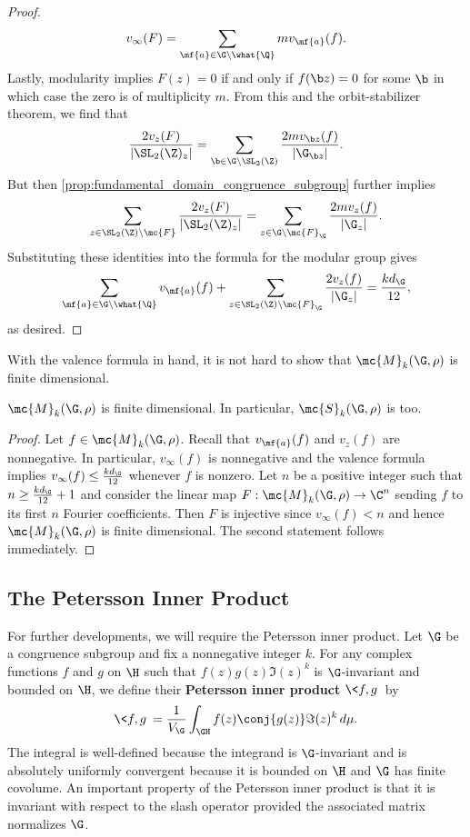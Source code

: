 \documentclass[12pt]{article}
\begin{document}
\begin{proof}
        \[
          v_{\infty}(F) = \sum_{\mf{a} \in \G\backslash\what{\Q}}mv_{\mf{a}}(f).
        \]
        Lastly, modularity implies \(F(z) = 0\) if and only if \(f(\b z) = 0\) for some \(\b\) in which case the zero is of multiplicity \(m\). From this and the orbit-stabilizer theorem, we find that
        \[
          \frac{2v_{z}(F)}{|\SL_{2}(\Z)_{z}|} = \sum_{\b \in \G\backslash\SL_{2}(\Z)}\frac{2mv_{\b z}(f)}{|\G_{\b z}|}.
        \]
        But then \cref{prop:fundamental_domain_congruence_subgroup} further implies
        \[
          \sum_{z \in \SL_{2}(\Z)\backslash\mc{F}}\frac{2v_{z}(F)}{|\SL_{2}(\Z)_{z}|} = \sum_{z \in \G\backslash\mc{F}_{\G}}\frac{2mv_{z}(f)}{|\G_{z}|}.
        \]
        Substituting these identities into the formula for the modular group gives
        \[
          \sum_{\mf{a} \in \G\backslash\what{\Q}}v_{\mf{a}}(f)+\sum_{z \in \SL_{2}(\Z)\backslash\mc{F}_{\G}}\frac{2v_{z}(f)}{|\G_{z}|} = \frac{kd_{\G}}{12},
        \]
        as desired.
      \end{proof}
      
      With the valence formula in hand, it is not hard to show that \(\mc{M}_{k}(\G,\rho)\) is finite dimensional.

      \begin{theorem}\label{thm:modular_forms_finite_dimensional}
        \(\mc{M}_{k}(\G,\rho)\) is finite dimensional. In particular, \(\mc{S}_{k}(\G,\rho)\) is too.
      \end{theorem}
      \begin{proof}
        Let \(f \in \mc{M}_{k}(\G,\rho)\). Recall that \(v_{\mf{a}}(f)\) and \(v_{z}(f)\) are nonnegative. In particular, \(v_{\infty}(f)\) is nonnegative and the valence formula implies \(v_{\infty}(f) \le \frac{kd_{\G}}{12}\) whenever \(f\) is nonzero. Let \(n\) be a positive integer such that \(n \ge \frac{kd_{\G}}{12}+1\) and consider the linear map \(F:\mc{M}_{k}(\G,\rho) \to \C^{n}\) sending \(f\) to its first \(n\) Fourier coefficients. Then \(F\) is injective since \(v_{\infty}(f) < n\) and hence \(\mc{M}_{k}(\G,\rho)\) is finite dimensional. The second statement follows immediately.
      \end{proof}
    \subsection{The Petersson Inner Product}
      For further developments, we will require the Petersson inner product. Let \(\G\) be a congruence subgroup and fix a nonnegative integer \(k\). For any complex functions \(f\) and \(g\) on \(\H\) such that \(f(z)g(z)\Im(z)^{k}\) is \(\G\)-invariant and bounded on \(\H\), we define their \textbf{Petersson inner product} \(\<f,g\>\) by
      \[
        \<f,g\> = \frac{1}{V_{\G}}\int_{\GH}f(z)\conj{g(z)}\Im(z)^{k}\,d\mu.
      \]
      The integral is well-defined because the integrand is \(\G\)-invariant and is absolutely uniformly convergent because it is bounded on \(\H\) and \(\G\) has finite covolume. An important property of the Petersson inner product is that it is invariant with respect to the slash operator provided the associated matrix normalizes \(\G\).
\end{document}
